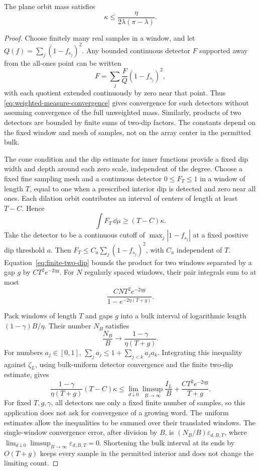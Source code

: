 \begin{lemma}\label{lem:detector-packing}
The plane orbit mass satisfies
\begin{equation}\label{eq:kappa-upper}
 \kappa\le\frac{\eta}{2\lambda(\pi-\lambda)}.
\end{equation}
\end{lemma}
\begin{proof}
Choose finitely many real samples in a window, and let
\(Q(f)=\sum_j(1-f_{s_j})^2\).
Any bounded continuous detector \(F\) supported away from the all-ones
point can be written
\[
 F=\sum_j \frac{F}{Q}(1-f_{s_j})^2,
\]
with each quotient extended continuously by zero near that point.
Thus \eqref{eq:weighted-measure-convergence} gives convergence for such
detectors without assuming convergence of the full unweighted mass.
Similarly, products of two detectors are bounded by finite sums of
two-dip factors. The constants depend on the fixed window and mesh of
samples, not on the array center in the permitted bulk.

The cone condition and the dip estimate for inner functions provide
a fixed dip width and depth around each zero scale, independent of the
degree. Choose a fixed fine sampling mesh and a continuous detector
\(0\le F_T\le1\) in a window of length \(T\), equal to one when a
prescribed interior dip is detected and zero near all ones.
Each dilation orbit contributes an interval of centers of length at
least \(T-C\). Hence
\[
 \int F_T\,\dd\mu\ge(T-C)\kappa.
\]
Take the detector to be a continuous cutoff of
\(\max_j|1-f_{s_j}|\) at a fixed positive dip threshold \(a\).
Then \(F_T\le C_a\sum_j(1-f_{s_j})^2\), with \(C_a\) independent of
\(T\). Equation~\eqref{eq:finite-two-dip} bounds the product for two
windows separated by a gap \(g\) by \(CT^2e^{-2\eta g}\).
For \(N\) regularly spaced windows, their pair integrals sum to at most
\[
 \frac{C N T^2e^{-2\eta g}}{1-e^{-2\eta(T+g)}}.
\]

Pack windows of length \(T\) and gaps \(g\) into a bulk interval of
logarithmic length \((1-\gamma)B/\eta\).
Their number \(N_B\) satisfies
\[
 \frac{N_B}{B}\longrightarrow
          \frac{1-\gamma}{\eta(T+g)}.
\]
For numbers \(a_j\in[0,1]\),
\(\sum_j a_j\le1+\sum_{j<k}a_ja_k\).
Integrating this inequality against \(\zeta_L\), using bulk-uniform
detector convergence and the finite two-dip estimate, gives
\[
 \frac{1-\gamma}{\eta(T+g)}(T-C)\kappa
 \le \lim_{d\downarrow0}\limsup_{B\to\infty}\frac{I_L}{B}
       +\frac{CT^2 e^{-2\eta g}}{T+g}.
\]
For fixed \(T,g,\gamma\), all detectors use only a fixed finite number
of samples, so this application does not ask for convergence of a
growing word. The uniform estimates allow the inequalities to be summed
over their translated windows. The single-window convergence error,
after division by \(B\), is \((N_B/B)\varepsilon_{d,B,T}\), where
\(\lim_{d\downarrow0}\limsup_{B\to\infty}\varepsilon_{d,B,T}=0\).
Shortening the bulk interval at its ends by \(O(T+g)\) keeps every
sample in the permitted interior and does not change the limiting count.


\end{proof}
